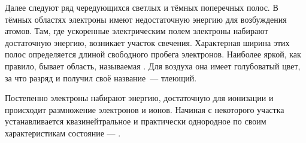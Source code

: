 Далее следуют ряд чередующихся светлых и тёмных поперечных полос. 
В тёмных областях электроны имеют недостаточную энергию 
для возбуждения атомов. Там, где ускоренные электрическим полем электроны 
набирают достаточную энергию, возникает участок свечения.
Характерная ширина этих полос определяется длиной свободного пробега электронов.
Наиболее яркой, как правило, бывает область,
называемая .
Для воздуха она имеет голубоватый цвет, за что разряд и получил своё 
название~--- тлеющий.

Постепенно электроны набирают энергию, достаточную для ионизации
и происходит размножение электронов и ионов.
Начиная с некоторого участка устанавливается квазинейтральное
и практически однородное по своим характеристикам состояние 
--- .




%
%
%
%
%
%

